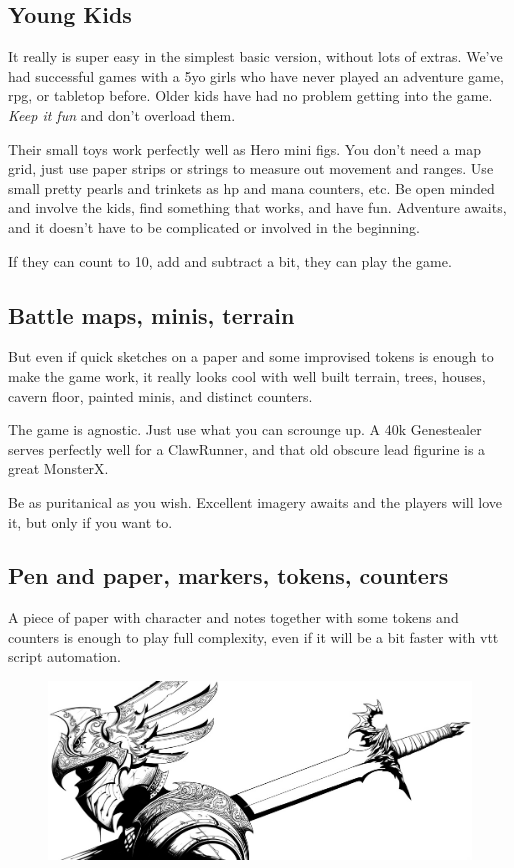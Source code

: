 \subsection*{Young Kids} 

It really is super easy in the simplest basic version, without lots of extras. We've had successful games with a 5yo girls who have never played an adventure game, rpg, or tabletop before. Older kids have had no problem getting into the game. \emph{Keep it fun} and don't overload them.

Their small toys work perfectly well as Hero mini figs. You don't need a map grid, just use paper strips or strings to measure out movement and ranges. Use small pretty pearls and trinkets as hp and mana counters, etc. Be open minded and involve the kids, find something that works, and have fun. Adventure awaits, and it doesn't have to be complicated or involved in the beginning.

If they can count to 10, add and subtract a bit, they can play the game.


\subsection*{Battle maps, minis, terrain}

But even if quick sketches on a paper and some improvised tokens is enough to make the game work, it really looks cool with well built terrain, trees, houses, cavern floor, painted minis, and distinct counters.

The game is agnostic. Just use what you can scrounge up. A 40k Genestealer serves perfectly well for a ClawRunner, and that old obscure lead figurine is a great MonsterX.

Be as puritanical as you wish. Excellent imagery awaits and the players will love it, but only if you want to.


\subsection*{Pen and paper, markers, tokens, counters}

A piece of paper with character and notes together with some tokens and counters is enough to play full complexity, even if it will be a bit faster with vtt script automation.


\begin{figure}[b]
\centering
\includegraphics[width=120mm]{./fig/deadhero.jpg}
\end{figure}








